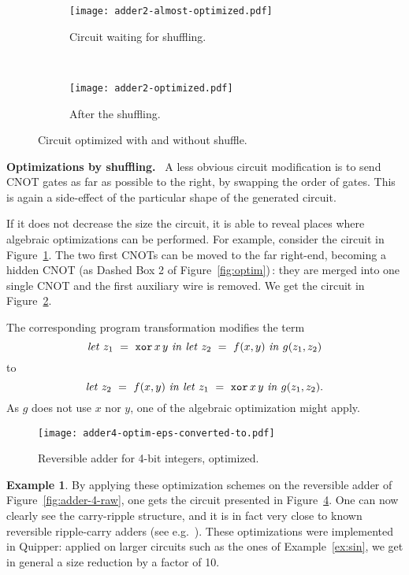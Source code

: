 \documentclass{article}
\theoremstyle{plain}
\theoremstyle{definition}
\newtheorem{example}[theorem]{Example}
\newcommand{\lettermx}[3]{{{\it let}~{#1}~=~{#2}~{\it in}~{#3}}}
\begin{document}
\begin{figure}[tb]
  \centering
  \begin{subfigure}[b]{0.4\textwidth}
    \texttt{[image: adder2-almost-optimized.pdf]}
    \caption{Circuit waiting for shuffling.}
    \label{fig:shuffling-1}
  \end{subfigure}~
  \begin{subfigure}[b]{0.4\textwidth}
    \texttt{[image: adder2-optimized.pdf]}
    \caption{After the shuffling.}
    \label{fig:shuffling-2}
  \end{subfigure}\caption{Circuit optimized with and without shuffle.}
  \label{fig:shuffling}
\end{figure}




\smallskip
\noindent
{\bf Optimizations by shuffling.}~
A less obvious circuit modification is to send CNOT gates as far as
possible to the right, by swapping the order of gates. This is again a
side-effect of the particular shape of the generated circuit.

If it does not decrease the size the circuit, it is able to reveal
places where algebraic optimizations can be performed. For example,
consider the circuit in Figure~\ref{fig:shuffling-1}. The two first
CNOTs can be moved to the far right-end, becoming a hidden
CNOT (as Dashed Box 2 of Figure~\ref{fig:optim})\,:
they are merged into one single CNOT and the first auxiliary wire
is removed. We get the circuit in Figure~\ref{fig:shuffling-2}.

The corresponding program transformation modifies the term
\[
\lettermx{z_1}{{\tt xor}\,x\,y}{\lettermx{z_2}{f(x,y)}{g(z_1,z_2)}}
\]
to
\[\lettermx{z_2}{f(x,y)}{}\lettermx{z_1}{{\tt xor}\,x\,y}{
g(z_1,z_2)}.
\]
As $g$ does not use $x$ nor $y$, one of the algebraic optimization
might apply.


\begin{figure}[tb]
  \centering
  \texttt{[image: adder4-optim-eps-converted-to.pdf]}
  \caption{Reversible adder for 4-bit integers, optimized.}
  \label{fig:adder-4-optim}
\end{figure}

\begin{example}
  By applying these optimization schemes on the reversible adder of
  Figure~\ref{fig:adder-4-raw}, one gets the circuit presented in
  Figure~\ref{fig:adder-4-optim}. One can now clearly see the
  carry-ripple structure, and it is in fact very close to known
  reversible ripple-carry adders (see
  e.g.~\cite{feynman85quantum}). These optimizations were implemented
  in Quipper: applied on larger circuits such as the ones of
  Example~\ref{ex:sin}, we get in general a size reduction by a factor
  of 10.
\end{example}
\end{document}

